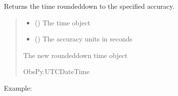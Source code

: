 \documentclass[letterpaper,10pt,english]{sphinxmanual}
\begin{document}

\begin{fulllineitems}
\label{\detokenize{api_core:amw.core.utils.time_floor}}
\pysigstartsignatures
{}
\pysigstopsignatures
\sphinxAtStartPar
Returns the time rounded\sphinxhyphen{}down to the specified accuracy.
\begin{quote}\begin{description}
\begin{itemize}
\item {} 
\sphinxAtStartPar
{} () \textendash{} The time object

\item {} 
\sphinxAtStartPar
{} () \textendash{} The accuracy units in seconds

\end{itemize}

\sphinxAtStartPar
The new rounded\sphinxhyphen{}down time object

\sphinxAtStartPar
ObsPy.UTCDateTime

\end{description}\end{quote}

\sphinxAtStartPar
Example:


\end{fulllineitems}
\end{document}
